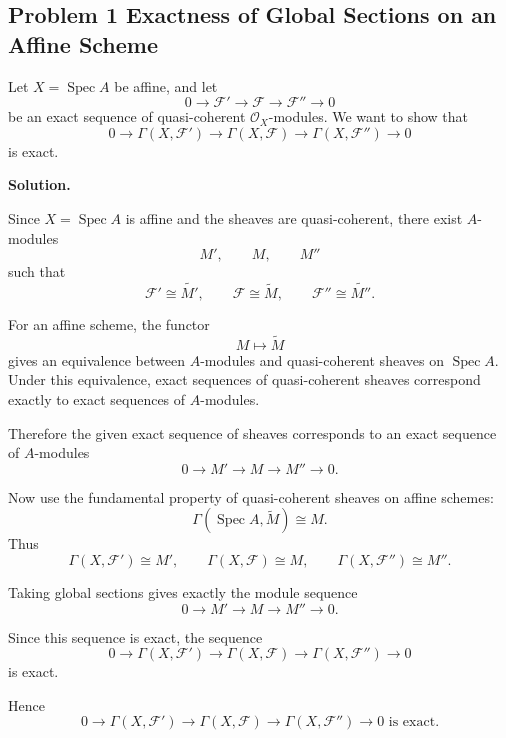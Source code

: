 
\subsection*{Problem 1 Exactness of Global Sections on an Affine Scheme}

Let \(X=\operatorname{Spec}A\) be affine, and let
\[
0\longrightarrow \mathcal F'
\longrightarrow \mathcal F
\longrightarrow \mathcal F''
\longrightarrow 0
\]
be an exact sequence of quasi-coherent \(\mathcal O_X\)-modules. We want to show that
\[
0\longrightarrow \Gamma(X,\mathcal F')
\longrightarrow \Gamma(X,\mathcal F)
\longrightarrow \Gamma(X,\mathcal F'')
\longrightarrow 0
\]
is exact.

\textbf{Solution.}

Since \(X=\operatorname{Spec}A\) is affine and the sheaves are quasi-coherent, there exist \(A\)-modules
\[
M',\qquad M,\qquad M''
\]
such that
\[
\mathcal F' \cong \widetilde{M'},
\qquad
\mathcal F \cong \widetilde M,
\qquad
\mathcal F'' \cong \widetilde{M''}.
\]

For an affine scheme, the functor
\[
M\longmapsto \widetilde M
\]
gives an equivalence between \(A\)-modules and quasi-coherent sheaves on \(\operatorname{Spec}A\). Under this equivalence, exact sequences of quasi-coherent sheaves correspond exactly to exact sequences of \(A\)-modules.

Therefore the given exact sequence of sheaves corresponds to an exact sequence of \(A\)-modules
\[
0\longrightarrow M'
\longrightarrow M
\longrightarrow M''
\longrightarrow 0.
\]

Now use the fundamental property of quasi-coherent sheaves on affine schemes:
\[
\Gamma(\operatorname{Spec}A,\widetilde M)\cong M.
\]
Thus
\[
\Gamma(X,\mathcal F')\cong M',
\qquad
\Gamma(X,\mathcal F)\cong M,
\qquad
\Gamma(X,\mathcal F'')\cong M''.
\]

Taking global sections gives exactly the module sequence
\[
0\longrightarrow M'
\longrightarrow M
\longrightarrow M''
\longrightarrow 0.
\]

Since this sequence is exact, the sequence
\[
0\longrightarrow \Gamma(X,\mathcal F')
\longrightarrow \Gamma(X,\mathcal F)
\longrightarrow \Gamma(X,\mathcal F'')
\longrightarrow 0
\]
is exact.

Hence
\[
\boxed{
	0\to \Gamma(X,\mathcal F')
	\to \Gamma(X,\mathcal F)
	\to \Gamma(X,\mathcal F'')
	\to 0
	\text{ is exact.}
}
\]
